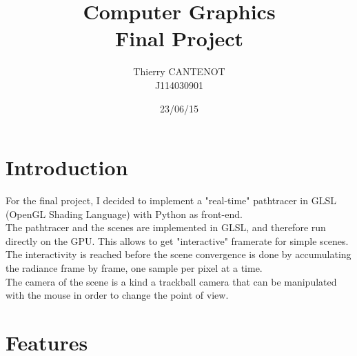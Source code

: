 \documentclass[a4paper,10pt]{article}
\title{\textbf{Computer Graphics} \\ Final Project}
\author{Thierry CANTENOT \\ J114030901}
\date{23/06/15}
\begin{document}
\maketitle

\begin{figure}[!htb]\centering
\end{figure}


\pagebreak
\section{Introduction}

For the final project, I decided to implement a "real-time" pathtracer in GLSL (OpenGL Shading Language) with Python as front-end. \\
The pathtracer and the scenes are implemented in GLSL, and therefore run directly on the GPU. This allows to get "interactive" framerate for simple scenes. The interactivity is reached before the scene convergence is done by accumulating the radiance frame by frame, one sample per pixel at a time.\\
The camera of the scene is a kind a trackball camera that can be manipulated with the mouse in order to change the point of view.

\section{Features}
\end{document}
